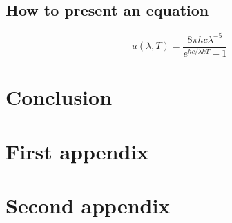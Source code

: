 \documentclass[12pt]{article}
\begin{document}
\subsection{How to present an equation}

\begin{equation}
    u(\lambda,T)=\frac{8\pi hc\lambda^{-5}}{e^{hc/\lambda kT}-1}
    \label{eq:1}
\end{equation}

\section{Conclusion}

\lipsum[1] \cite{refs1, refs2, refs3}




\appendix  
\clearpage
\addappheadtotoc 
\appendixpage 

\section{First appendix}

\lipsum[1]

\section{Second appendix}

\lipsum[1]
\end{document}
